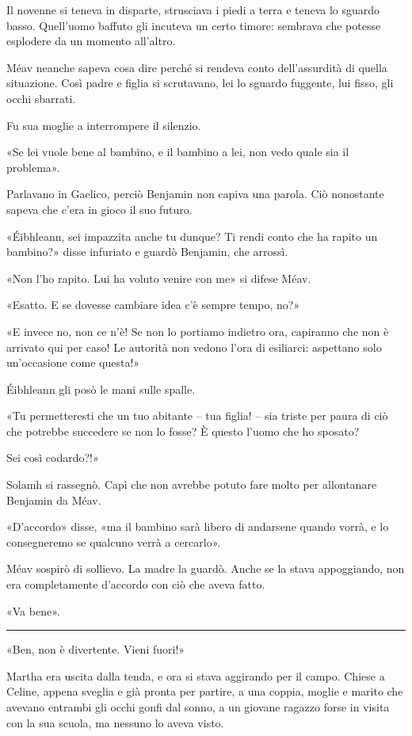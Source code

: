 \documentclass[a4paper,10pt]{memoir}
\begin{document}
Il novenne si teneva in disparte, strusciava i piedi a terra e teneva lo sguardo basso. Quell'uomo baffuto gli incuteva
un certo timore: sembrava che potesse esplodere da un momento all'altro.

Méav neanche sapeva cosa dire perché si rendeva conto dell'assurdità di quella situazione. Così padre e figlia si
scrutavano, lei lo sguardo fuggente, lui fisso, gli occhi sbarrati.

Fu sua moglie a interrompere il silenzio.

«Se lei vuole bene al bambino, e il bambino a lei, non vedo quale sia il problema».

Parlavano in Gaelico, perciò Benjamin non capiva una parola. Ciò nonostante sapeva che c'era in gioco il suo futuro.

«Éibhleann, sei impazzita anche tu dunque? Ti rendi conto che ha rapito un bambino?» disse infuriato e guardò Benjamin,
che arrossì.

«Non l'ho rapito. Lui ha voluto venire con me» si difese Méav.

«Esatto. E se dovesse cambiare idea c'è sempre tempo, no?»

«E invece no, non ce n'è! Se non lo portiamo indietro ora, capiranno che non è arrivato qui per caso! Le autorità non
vedono l'ora di esiliarci: aspettano solo un'occasione come questa!»

Éibhleann gli posò le mani sulle spalle.

«Tu permetteresti che un tuo abitante -- tua figlia! -- sia triste per paura di ciò che potrebbe succedere se non lo
fosse? È questo l'uomo che ho sposato?

Sei così codardo?!»

Solamh si rassegnò. Capì che non avrebbe potuto fare molto per allontanare Benjamin da Méav.

«D'accordo» disse, «ma il bambino sarà libero di andarsene quando vorrà, e lo consegneremo se qualcuno verrà a
cercarlo».

Méav sospirò di sollievo. La madre la guardò. Anche se la stava appoggiando, non era completamente d'accordo con ciò che
aveva fatto.

«Va bene».

\plainbreak{1}

«Ben, non è divertente. Vieni fuori!»

Martha era uscita dalla tenda, e ora si stava aggirando per il campo. Chiese a Celine, appena sveglia e già pronta per
partire, a una coppia, moglie e marito che avevano entrambi gli occhi gonfi dal sonno, a un giovane ragazzo forse in
visita con la sua scuola, ma nessuno lo aveva visto.
\end{document}
